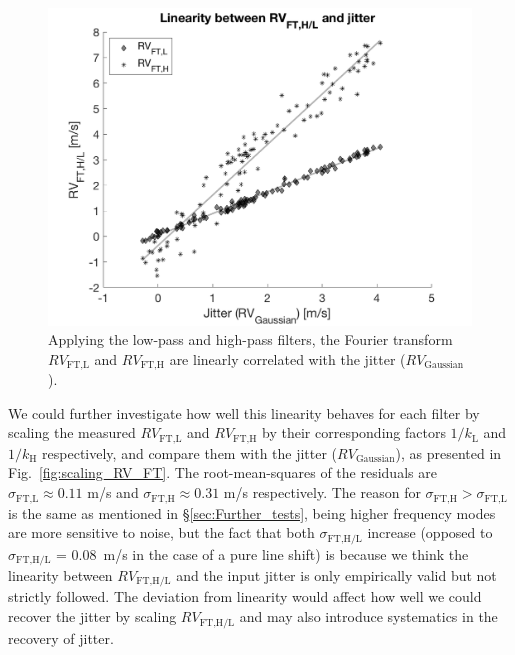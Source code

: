 \begin{figure}[tbp]
\centering
\includegraphics[width = 0.7 \linewidth]
{./Figures/Methods/5-JITTER_ONLY_1.png}
\caption[Fourier transform in response to line deformation]
{Applying the low-pass and high-pass filters, the Fourier transform $RV_\text{FT,L}$ and $RV_\text{FT,H}$ are linearly correlated with the jitter ($RV_\text{Gaussian}$).}
\label{fig:FT_vs_Gaussian}
\end{figure} 

We could further investigate how well this linearity behaves for each filter by scaling the measured $RV_\text{FT,L}$ and $RV_\text{FT,H}$ by their corresponding factors $1/k_\text{L}$ and $1/k_\text{H}$ respectively, and compare them with the jitter ($RV_\text{Gaussian}$), as presented in Fig.~\ref{fig:scaling_RV_FT}. The root-mean-squares of the residuals are $\sigma_\text{FT,L} \approx 0.11$ m/s and $\sigma_\text{FT,H} \approx 0.31$ m/s respectively. The reason for $\sigma_\text{FT,H}>\sigma_\text{FT,L}$ is the same as mentioned in \S\ref{sec:Further_tests}, being higher frequency modes are more sensitive to noise, but the fact that both $\sigma_\text{FT,H/L}$ increase (opposed to $\sigma_\text{FT,H/L}$ = 0.08~m/s in the case of a pure line shift) is because we think the linearity between $RV_\text{FT,H/L}$ and the input jitter is only empirically valid but not strictly followed. The deviation from linearity would affect how well we could recover the jitter by scaling $RV_\text{FT,H/L}$ and may also introduce systematics in the recovery of jitter. 

